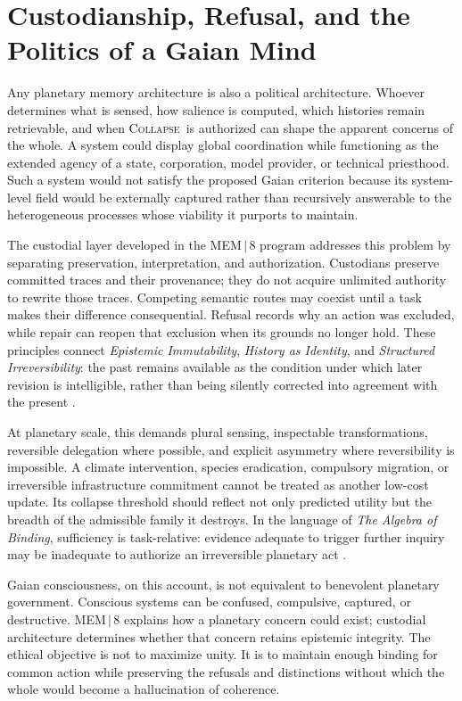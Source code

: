 \documentclass[11pt]{article}
\newcommand{\Collapse}{\textsc{Collapse}}
\begin{document}
\section{Custodianship, Refusal, and the Politics of a Gaian Mind}
\label{sec:custodianship}

Any planetary memory architecture is also a political architecture. Whoever determines what is sensed, how salience is computed, which histories remain retrievable, and when \Collapse\ is authorized can shape the apparent concerns of the whole. A system could display global coordination while functioning as the extended agency of a state, corporation, model provider, or technical priesthood. Such a system would not satisfy the proposed Gaian criterion because its system-level field would be externally captured rather than recursively answerable to the heterogeneous processes whose viability it purports to maintain.

The custodial layer developed in the MEM\,$|$\,8 program addresses this problem by separating preservation, interpretation, and authorization. Custodians preserve committed traces and their provenance; they do not acquire unlimited authority to rewrite those traces. Competing semantic routes may coexist until a task makes their difference consequential. Refusal records why an action was excluded, while repair can reopen that exclusion when its grounds no longer hold. These principles connect \emph{Epistemic Immutability}, \emph{History as Identity}, and \emph{Structured Irreversibility}: the past remains available as the condition under which later revision is intelligible, rather than being silently corrected into agreement with the present \cite{flyxionEI,flyxionHistory,flyxionIrreversibility}.

At planetary scale, this demands plural sensing, inspectable transformations, reversible delegation where possible, and explicit asymmetry where reversibility is impossible. A climate intervention, species eradication, compulsory migration, or irreversible infrastructure commitment cannot be treated as another low-cost update. Its collapse threshold should reflect not only predicted utility but the breadth of the admissible family it destroys. In the language of \emph{The Algebra of Binding}, sufficiency is task-relative: evidence adequate to trigger further inquiry may be inadequate to authorize an irreversible planetary act \cite{flyxionBinding}.

Gaian consciousness, on this account, is not equivalent to benevolent planetary government. Conscious systems can be confused, compulsive, captured, or destructive. MEM\,$|$\,8 explains how a planetary concern could exist; custodial architecture determines whether that concern retains epistemic integrity. The ethical objective is not to maximize unity. It is to maintain enough binding for common action while preserving the refusals and distinctions without which the whole would become a hallucination of coherence.
\end{document}
